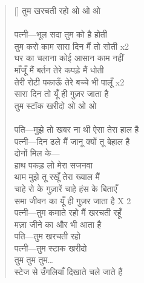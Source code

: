 \begin{verse}[\versewidth]
{तुम खरचती रहो ओ ओ ओ\\
\\
पत्नी—भूल सदा तुम को है होती\\
तुम करो काम सारा दिन मैं तो सोती x2\\
घर का चलाना कोई आसान काम नहीं\\
माँजूँ मैं बर्तन तेरे कपड़े मैं धोती\\
तेरी रोटी पकाऊँ तेरे बच्चे भी पालूँ x2\\
सारा दिन तो यूँ ही गुज़र जाता है\\
तुम स्टॉक खरीदो ओ ओ ओ\\
\\
पति—मुझे तो खबर ना थी ऐसा तेरा हाल है\\
पत्नी—दिन ढले मैं जानू क्यों तू बेहाल है\\
दोनों मिल के—\\
हाथ पकड़ लो मेरा सजनवा\\
थाम मुझे तू रखूँ तेरा ख्याल मैं\\
चाहे रो के गुज़ारें चाहे हंस के बिताएँ\\
समा जीवन का यूँ ही गुज़र जाता है X 2\\
पत्नी—तुम कमाते रहो मैं खरचती रहूँ\\
मज़ा जीने का और भी आता है\\
पति—तुम खरचती रहो\\
पत्नी—तुम स्टाक खरीदो\\
तुम तुम तुम…\\
स्टेज से उँगलियाँ दिखाते चले जाते हैं
}\end{verse}

